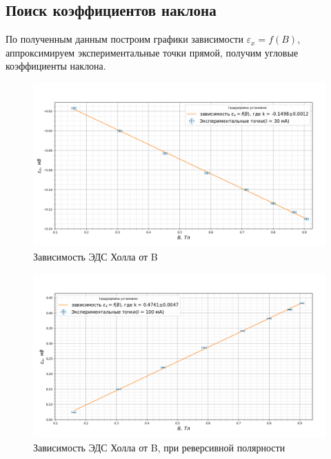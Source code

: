 \documentclass[a4paper, 12pt]{article}%
\begin{document}
	\subsection*{Поиск коэффициентов наклона}
	По полученным данным построим графики зависимости $\varepsilon_x=f(B)$, аппроксимируем экспериментальные точки прямой, получим угловые коэффициенты наклона.\\
	\begin{figure}[H]
		\centering
		\includegraphics[width=0.8\linewidth]{30}
		\caption{Зависимость ЭДС Холла от B}
		\label{fig:30}
	\end{figure}
	\begin{figure}[H]
		\centering
		\includegraphics[width=0.8\linewidth]{100}
		\caption{Зависимость ЭДС Холла от B, при реверсивной полярности}
		\label{fig:100}
	\end{figure}
\end{document}

